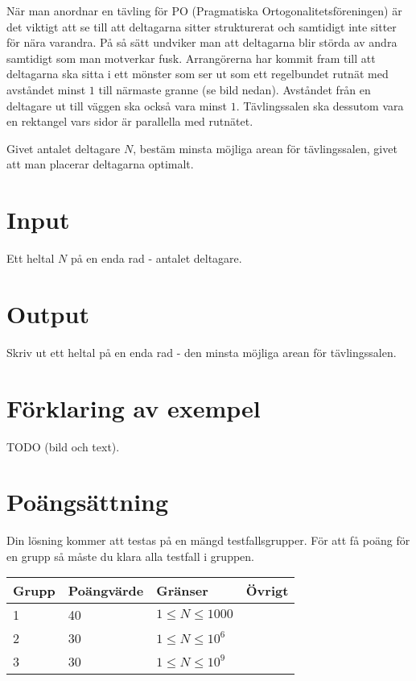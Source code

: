 När man anordnar en tävling för PO (Pragmatiska Ortogonalitetsföreningen) är
det viktigt att se till att deltagarna sitter strukturerat och samtidigt inte
sitter för nära varandra. På så sätt undviker man att
deltagarna blir störda av andra samtidigt som man motverkar fusk.
Arrangörerna har kommit fram till att deltagarna ska sitta i ett mönster som ser ut
som ett regelbundet rutnät med avståndet minst $1$ till närmaste granne (se bild nedan).
Avståndet från en deltagare ut till väggen ska också vara minst $1$.
Tävlingssalen ska dessutom vara en rektangel vars sidor är parallella med rutnätet.

Givet antalet deltagare $N$, bestäm minsta möjliga arean för tävlingssalen, givet att man placerar
deltagarna optimalt.

\section*{Input}
Ett heltal $N$ på en enda rad - antalet deltagare.

\section*{Output}
Skriv ut ett heltal på en enda rad - den minsta möjliga arean för tävlingssalen.

\section*{Förklaring av exempel}
TODO (bild och text).

\section*{Poängsättning}
Din lösning kommer att testas på en mängd testfallsgrupper. För att få poäng
för en grupp så måste du klara alla testfall i gruppen.

\begin{tabular}{| l | l | l | l |}
\hline
Grupp & Poängvärde & Gränser & Övrigt\\ \hline
1     & 40         & $ 1 \le N \le 1000 $ & \\ \hline
2     & 30         & $ 1 \le N \le 10^6 $ & \\ \hline
3     & 30         & $ 1 \le N \le 10^9 $ & \\ \hline
\end{tabular}
